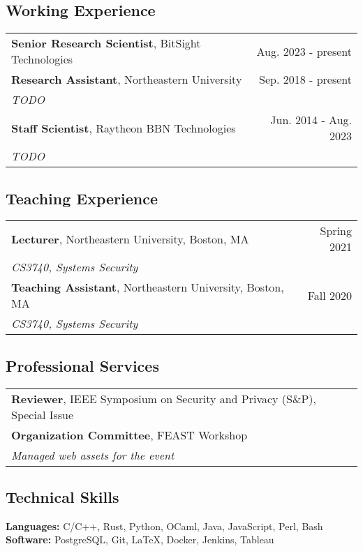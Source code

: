 \documentclass[11pt]{article}
\begin{document}
\subsection{Working Experience}
\label{sec:working-experience}

\begin{tabularx}{\textwidth}{>{\raggedright\arraybackslash}p{8cm}>{\raggedright\arraybackslash}r}
    \textbf{Senior Research Scientist}, BitSight Technologies & Aug. 2023 - present \\
    \textbf{Research Assistant}, Northeastern University & Sep. 2018 - present \\
    \textit{TODO} & \\
    \textbf{Staff Scientist}, Raytheon BBN Technologies & Jun. 2014 - Aug. 2023 \\
    \textit{TODO} & \\
\end{tabularx}

\subsection{Teaching Experience}
\label{sec:teaching-experience}

\begin{tabularx}{\textwidth}{>{\raggedright\arraybackslash}p{8cm}>{\raggedright\arraybackslash}r}
    \textbf{Lecturer}, Northeastern University, Boston, MA & Spring 2021 \\
    \textit{CS3740, Systems Security} & \\
    \textbf{Teaching Assistant}, Northeastern University, Boston, MA & Fall 2020 \\
    \textit{CS3740, Systems Security} & \\
\end{tabularx}

\subsection{Professional Services}
\label{sec:services}

\begin{tabularx}{\textwidth}{>{\raggedright\arraybackslash}p{8cm}>{\raggedright\arraybackslash}r}
    \textbf{Reviewer}, IEEE Symposium on Security and Privacy (S\&P), Special Issue & 2022 \\
    \textbf{Organization Committee}, FEAST Workshop & 2020 \\
    \textit{Managed web assets for the event} & \\
\end{tabularx}

\subsection{Technical Skills}
\label{sec:skills}

\textbf{Languages:} C/C++, Rust, Python, OCaml, Java, JavaScript, Perl, Bash \\

\textbf{Software:} PostgreSQL, Git, LaTeX, Docker, Jenkins, Tableau \\
\end{document}

